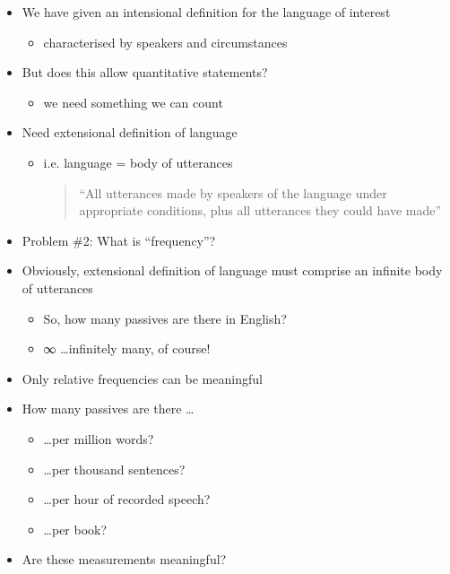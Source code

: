 \documentclass[a4paper,landscape,headrule,footrule,xetex]{foils}
\begin{document}
\begin{itemize}
\item We have given an intensional definition for
the language of interest
\begin{itemize}
\item characterised by speakers and circumstances
\end{itemize}
\item But does this allow quantitative statements?
\begin{itemize}
\item we need something we can count
\end{itemize}
\item Need extensional definition of language
\begin{itemize}
\item i.e. language = body of utterances
  \begin{quote}
“All utterances made by speakers of the
language under appropriate conditions,
plus all utterances they could have made”
\end{quote}
\end{itemize}
\end{itemize}
\begin{itemize}
\item Problem \#2: What is “frequency”?
\item Obviously, extensional definition of language
must comprise an infinite body of utterances
\begin{itemize}
\item So, how many passives are there in English?
\item ∞ \ldots infinitely many, of course!
\end{itemize}
\item Only relative frequencies can be meaningful
\end{itemize}

\begin{itemize}
\item How many passives are there …
\begin{itemize}
\item \ldots per million words?
\item \ldots per thousand sentences?
\item \ldots per hour of recorded speech?
\item \ldots per book?
\end{itemize}
\item Are these measurements meaningful?
\end{itemize}
\end{document}
